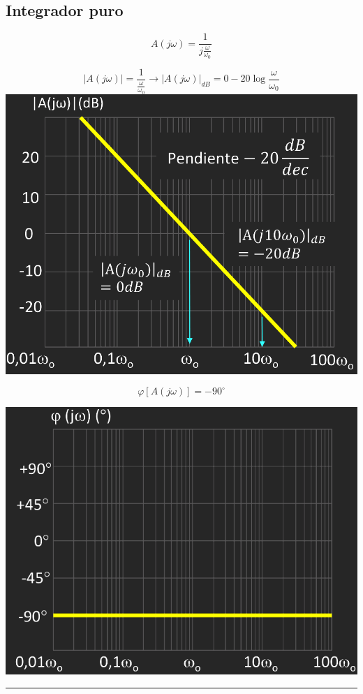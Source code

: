 \documentclass{article}
\begin{document}
\subsection{Integrador puro}
$$
A (j \omega) = \frac{1}{j \frac{\omega}{\omega_0}}
$$
\begin{minipage}{0.49\textwidth}
$$
|A (j \omega)| = \frac{1}{\frac{\omega}{\omega_0}} \to |A (j \omega)|_{dB} = 0 - 20 \log \frac{\omega}{\omega_0}
$$
    \centering
    \includegraphics[width=\textwidth]{figbode231.jpg} 
\end{minipage}
\begin{minipage}{0.49\textwidth}
$$
\varphi [A (j \omega)] = -90^\circ
$$

\bigskip

    \centering
    \includegraphics[width=\textwidth]{figbode232.jpg} 
\end{minipage}
\hrule
\end{document}
